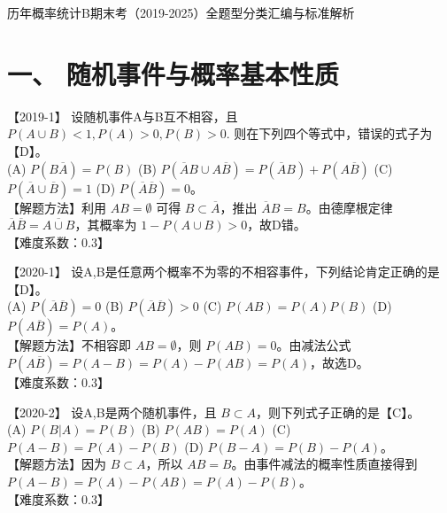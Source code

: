 \documentclass[zihao=4, a4paper, fontset=mac]{ctexart}
\begin{document}
\bfseries %

\begin{center}
\LARGE 历年概率统计B期末考（2019-2025）全题型分类汇编与标准解析
\end{center}

\section*{一、 随机事件与概率基本性质}

【2019-1】 设随机事件A与B互不相容，且 $P(A\cup B)<1, P(A)>0, P(B)>0$. 则在下列四个等式中，错误的式子为【D】。\\
(A) $P(B\overline{A})=P(B)$ \quad (B) $P(\overline{A}B\cup A\overline{B})=P(\overline{A}B)+P(A\overline{B})$ \quad (C) $P(\overline{A}\cup\overline{B})=1$ \quad (D) $P(\overline{A}\overline{B})=0$。\\
【解题方法】利用 $AB=\emptyset$ 可得 $B\subset\overline{A}$，推出 $\overline{A}B=B$。由德摩根定律 $\overline{A}\overline{B}=\overline{A\cup B}$，其概率为 $1-P(A\cup B)>0$，故D错。\\
【难度系数：0.3】

\par\vspace{\baselineskip}

【2020-1】 设A,B是任意两个概率不为零的不相容事件，下列结论肯定正确的是【D】。\\
(A) $P(\overline{A}\overline{B})=0$ \quad (B) $P(\overline{A}\overline{B})>0$ \quad (C) $P(AB)=P(A)P(B)$ \quad (D) $P(A\overline{B})=P(A)$。\\
【解题方法】不相容即 $AB=\emptyset$，则 $P(AB)=0$。由减法公式 $P(A\overline{B})=P(A-B)=P(A)-P(AB)=P(A)$，故选D。\\
【难度系数：0.3】

\par\vspace{\baselineskip}

【2020-2】 设A,B是两个随机事件，且 $B\subset A$，则下列式子正确的是【C】。\\
(A) $P(B|A)=P(B)$ \quad (B) $P(AB)=P(A)$ \quad (C) $P(A-B)=P(A)-P(B)$ \quad (D) $P(B-A)=P(B)-P(A)$。\\
【解题方法】因为 $B\subset A$，所以 $AB=B$。由事件减法的概率性质直接得到 $P(A-B)=P(A)-P(AB)=P(A)-P(B)$。\\
【难度系数：0.3】

\par\vspace{\baselineskip}
\end{document}
